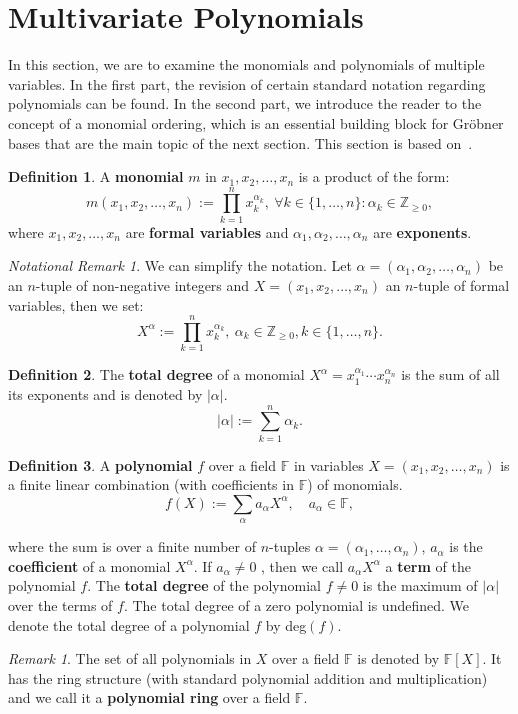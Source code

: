 \documentclass[thesis=M,english]{FITthesis}[2012/10/20]
\theoremstyle{remark}
\newtheorem*{RM}{Remark}
\newtheorem*{NRM}{Notational Remark}
\theoremstyle{definition}
\newtheorem{DF}{Definition}[section]
\begin{document}
\section{Multivariate Polynomials}
In this section, we are to examine the monomials and polynomials of multiple variables. In the first part, the revision of certain standard notation regarding polynomials can be found. In the second part, we introduce the reader to the concept of a monomial ordering, which is an essential building block for Gröbner bases that are the main topic of the next section. This section is based on~\cite{algGeom}.
\begin{DF}
A \textbf{monomial} $m$ in $x_1,x_2,\ldots,x_n$ is a product of the form:
$$
m(x_1,x_2,\ldots,x_n) :=  \prod_{k=1}^nx_k^{\alpha_k},\ \forall k \in \{1, \ldots, n\}: \alpha_k \in\mathbb{Z}_{\geq 0},
$$
where $x_1,x_2,\ldots,x_n$ are \textbf{formal variables} and $\alpha_1,\alpha_2,\ldots,\alpha_n$ are \textbf{exponents}. 
\end{DF}
\begin{NRM} We can simplify the notation. Let $\alpha = (\alpha_1,\alpha_2,\ldots,\alpha_n)$ be an $n$-tuple of non-negative integers and $X = (x_1,x_2,\ldots,x_n)$ an $n$-tuple of formal variables, then we set:
$$
X^\alpha := \prod_{k=1}^nx_k^{\alpha_k},\ \alpha_k \in\mathbb{Z}_{\geq 0}, k \in \{1, \ldots, n\}.
$$
\end{NRM}
\begin{DF}
The \textbf{total degree} of a monomial $X^\alpha=x_1^{\alpha_1}\cdots x_n^{\alpha_n}$ is the sum of all its exponents and is denoted by $|\alpha|$.
$$
|\alpha| := \sum_{k=1}^n \alpha_k.
$$
\end{DF}
\begin{DF}
A \textbf{polynomial}  $f$ over a field $\mathbb{F}$ in variables $X = (x_1,x_2,\ldots,x_n)$ is a finite linear combination (with coefficients in $\mathbb{F}$) of monomials.
$$
f(X) := \sum_{\alpha} a_{\alpha}X^\alpha, \quad a_{\alpha} \in \mathbb{F},
$$
\end{DF}
\noindent where the sum is over a finite number of $n$-tuples $\alpha = (\alpha_1, \ldots, \alpha_n)$, $a_\alpha$ is the \textbf{coefficient} of a monomial $X^\alpha$. If $a_\alpha \neq 0$ , then we call $a_{\alpha}X^\alpha$ a \textbf{term} of the  polynomial $f$. The \textbf{total degree} of the polynomial $f \neq 0$ is the maximum  of $|\alpha |$ over the terms of $f$. The total degree of a zero polynomial is undefined. We denote the total degree of a polynomial $f$ by deg$(f)$.
\begin{RM}
The set of all polynomials in $X$ over a field $\mathbb{F}$ is denoted by $\mathbb{F}[X]$. It has the ring structure (with standard polynomial addition and multiplication) and we call it a \textbf{polynomial ring} over a field $\mathbb{F}$.
\end{RM}
\end{document}
